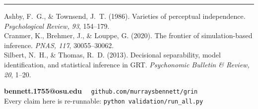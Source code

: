 \documentclass[final]{article}
\begin{document}
\vfill
{\color{gmute}\rule{\textwidth}{2pt}}
\vspace{0.05in}

\noindent
\begin{minipage}[t]{0.62\textwidth}
\setlength{\parskip}{0pt}%
{\color{gink}
Ashby, F.~G., \& Townsend, J.~T. (1986). Varieties of perceptual independence.
\emph{Psychological Review, 93}, 154--179.\\[0.06in]
Cranmer, K., Brehmer, J., \& Louppe, G. (2020). The frontier of simulation-based
inference. \emph{PNAS, 117}, 30055--30062.\\[0.06in]
Silbert, N.~H., \& Thomas, R.~D. (2013). Decisional separability, model
identification, and statistical inference in GRT. \emph{Psychonomic Bulletin \&
Review, 20}, 1--20.
\par}
\end{minipage}%
\hfill
\begin{minipage}[t]{0.34\textwidth}
\setlength{\parskip}{0pt}%
\raggedleft
{\smallfont\color{gink}
\textbf{bennett.1755@osu.edu} \ \textbullet\ \texttt{github.com/murraysbennett/grin}\\
Every claim here is re-runnable: \texttt{python validation/run\_all.py}
\par}
\end{minipage}
\end{document}
